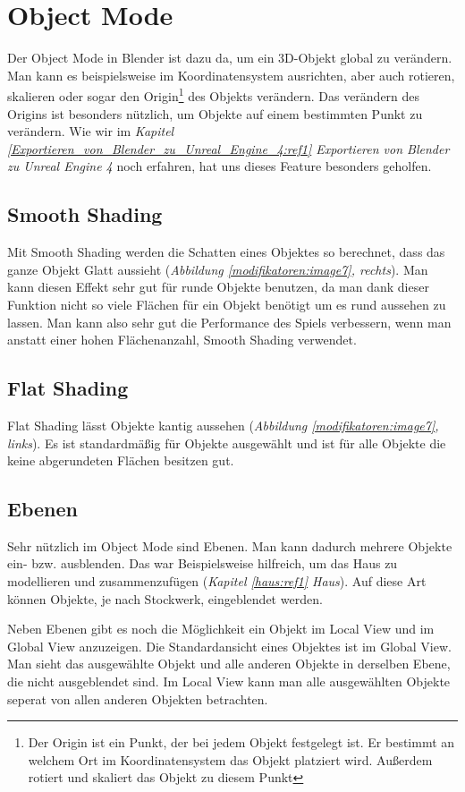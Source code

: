 \section{Object Mode}
Der Object Mode in Blender ist dazu da, um ein 3D-Objekt global zu verändern. Man kann es beispielsweise im Koordinatensystem ausrichten, aber
auch rotieren, skalieren oder sogar den Origin\footnote{Der Origin ist ein Punkt, der bei jedem Objekt festgelegt ist. Er bestimmt an welchem Ort im Koordinatensystem das Objekt platziert wird. Außerdem rotiert und skaliert das Objekt zu diesem Punkt}
des Objekts verändern. Das verändern des Origins ist besonders nützlich, um Objekte auf einem bestimmten Punkt zu verändern.
Wie wir im \textit{Kapitel \ref{Exportieren_von_Blender_zu_Unreal_Engine_4:ref1} \dq Exportieren von Blender zu Unreal Engine 4\dq} noch erfahren, hat uns dieses Feature besonders geholfen.

\subsection{Smooth Shading}
\label{objectMode:smoothshading}
Mit Smooth Shading werden die Schatten eines Objektes so berechnet, dass das ganze Objekt Glatt aussieht (\textit{Abbildung \ref{modifikatoren:image7}, rechts}).\citep{smoothshading:link}
Man kann diesen Effekt sehr gut für runde Objekte benutzen, da man dank dieser Funktion nicht so viele Flächen für ein Objekt benötigt um
es rund aussehen zu lassen. Man kann also sehr gut die Performance des Spiels verbessern, wenn man anstatt einer hohen Flächenanzahl, Smooth Shading verwendet.

\subsection{Flat Shading}
Flat Shading lässt Objekte kantig aussehen (\textit{Abbildung \ref{modifikatoren:image7}, links}).
Es ist standardmäßig für Objekte ausgewählt und ist für alle Objekte die keine abgerundeten Flächen besitzen gut.

\subsection{Ebenen}
Sehr nützlich im Object Mode sind Ebenen. Man kann dadurch mehrere Objekte ein- bzw. ausblenden.
Das war Beispielsweise hilfreich, um das Haus zu modellieren und zusammenzufügen (\textit{Kapitel \ref{haus:ref1} \dq Haus\dq}).
Auf diese Art können Objekte, je nach Stockwerk, eingeblendet werden.

Neben Ebenen gibt es noch die Möglichkeit ein Objekt im Local View und im Global View anzuzeigen.
Die Standardansicht eines Objektes ist im Global View. Man sieht das ausgewählte Objekt und alle anderen Objekte in derselben Ebene, die nicht ausgeblendet sind.
Im Local View kann man alle ausgewählten Objekte seperat von allen anderen Objekten betrachten.

